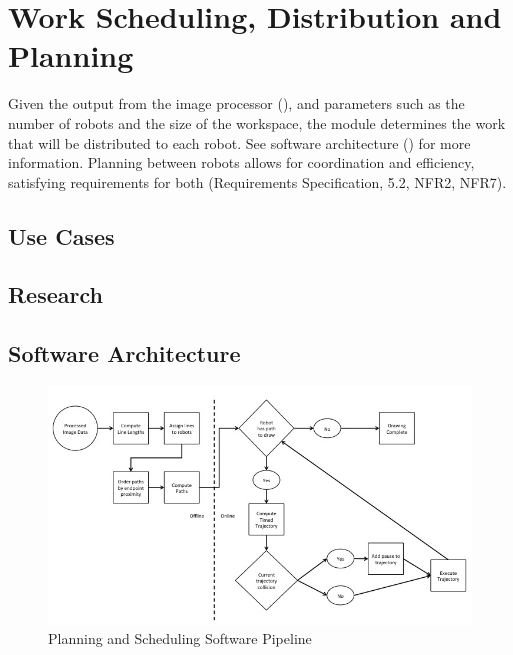 
\section{Work Scheduling, Distribution and Planning}
\label{sec:planning}
Given the output from the image processor (), and parameters such as the number of robots and the size of the workspace, the module determines the work that will be distributed to each robot. See software architecture () for more information. Planning between robots allows for coordination and efficiency, satisfying requirements for both (Requirements Specification, 5.2, NFR2, NFR7). \\

\subsection{Use Cases}

\subsection{Research}

\subsection{Software Architecture}
\label{sec:sw_arch_planner}

\begin{figure}[h!]
 \centering
  \includegraphics[width=0.99\columnwidth]{diagrams/sw_arch_planning.jpg}
	\caption{Planning and Scheduling Software Pipeline}
 \label{fig:planning_processing}
\end{figure}

